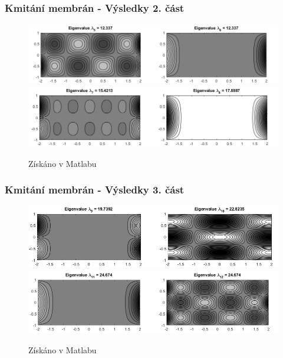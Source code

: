 \documentclass[xcolor=table]{beamer}
\begin{document}
\begin{frame}
\frametitle{Kmitání membrán - Výsledky 2. část}
\centering
\begin{figure}
\includegraphics[width=1\linewidth]{obdelnicky3.png}
\includegraphics[width=1\linewidth]{obdelnicky4.png}
\caption{Získáno v Matlabu}
\end{figure}
\end{frame}

\begin{frame}
\frametitle{Kmitání membrán - Výsledky 3. část}
\centering
\begin{figure}
\includegraphics[width=1\linewidth]{obdelnicky5.png}
\includegraphics[width=1\linewidth]{obdelnicky6.png}
\caption{Získáno v Matlabu}
\end{figure}
\end{frame}
\end{document}
